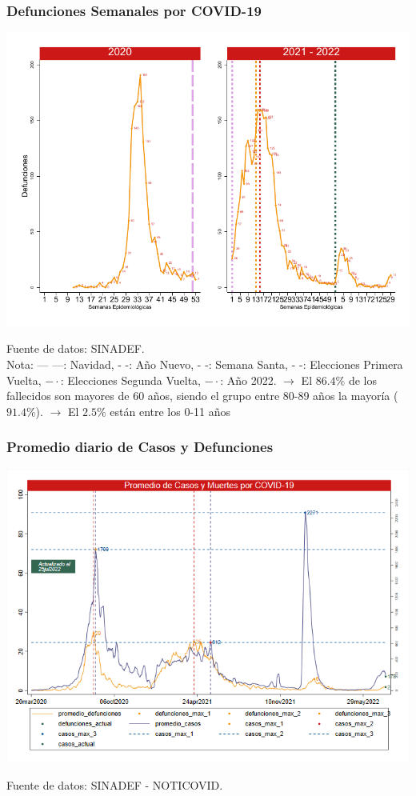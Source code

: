 \documentclass[xcolor=table]{beamer}
\begin{document}
	\begin{frame}
		\frametitle{Defunciones Semanales por COVID-19}
		\vspace{-.5cm}
		\begin{center}
			\includegraphics[width=0.9\linewidth, trim={0cm .5cm 0cm 0.2cm},clip]{../figuras/defunciones_semanales_20_21_22.pdf}
		\end{center}
		{\tiny Fuente de datos: SINADEF.\\
		Nota: {\color{mycolor1} --- ---: Navidad}, {\color{mycolor1} - -: Año Nuevo}, {\color{mycolor2} - -: Semana Santa}, {\color{mycolor3} - -: Elecciones Primera Vuelta}, {\color{mycolor4} $- \cdot$: Elecciones Segunda Vuelta},
		{\color{mycolor7} $- \cdot$: Año 2022}. 
	$\rightarrow$ El $86.4\%$ de los fallecidos son mayores de 60 años, siendo el grupo entre 80-89 años la mayoría ($91.4\%$).
	$\rightarrow$ El $2.5\%$ están entre los 0-11 años\\}
	\end{frame}
	
		\begin{frame}
		\frametitle{Promedio diario de Casos y Defunciones}
		\vspace{-.5cm}
		\begin{center}
			\includegraphics[width=0.9\linewidth, trim={0cm .5cm 0cm 0.2cm},clip]{../figuras/promedio_casos_defuncion_2020_2021_2022.png}
		\end{center}
		{\tiny Fuente de datos: SINADEF - NOTICOVID.}\\
	\end{frame}
	
\end{document}
